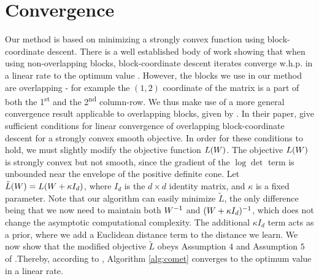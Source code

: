 \documentclass{article}
\begin{document}
\section{Convergence}
Our method is based on minimizing a strongly convex function using block-coordinate descent. There is a well established body of work showing that when using non-overlapping blocks, block-coordinate descent iterates converge w.h.p. in a linear rate to the optimum value \cite{nesterov2012efficiency,richtarik2014iteration}.
However, the blocks we use in our method are overlapping - for example the $(1,2)$ coordinate of the matrix is a part of both the 1\textsuperscript{st} and the 2\textsuperscript{nd} column-row. We thus make use of a more general convergence result applicable to overlapping blocks, given by \citet{richtarik2013optimal}. 
In their paper, \citet{richtarik2013optimal} give sufficient conditions for linear convergence of overlapping block-coordinate descent for a strongly convex smooth objective.
In order for these conditions to hold, we must slightly modify the objective function $L({{W}})$. The objective $L({W})$ is strongly convex but not smooth, since the gradient of the $\log \det$ term is unbounded near the envelope of the positive definite cone. Let $\tilde{L}({{W}}) = L({{W} + \kappa I_d})$, where $I_d$ is the $d \times d$ identity matrix, and $\kappa$ is a fixed parameter.
Note that our algorithm can easily minimize $\tilde{L}$, the only difference being that we now need to maintain both ${W}^{-1}$ and $({W}+\kappa I_d)^{-1}$, which does not change the asymptotic computational complexity. The additional $\kappa I_d$ term acts as a prior, where we add a Euclidean distance term to the distance we learn. 
We now show that the modified objective $\tilde{L}$ obeys Assumption $4$ and Assumption $5$ of \citet{richtarik2013optimal}.Thereby, according to \citet[Theorems 3 and 7]{richtarik2013optimal}, Algorithm \ref{alg:comet} converges to the optimum value in a linear rate.
\end{document}
